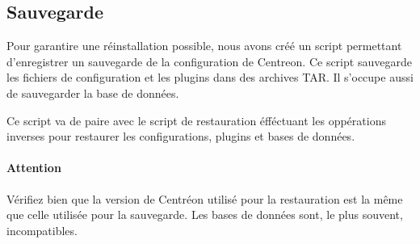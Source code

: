 	\subsection{Sauvegarde}

	Pour garantire une réinstallation possible, nous avons créé un script permettant d'enregistrer un sauvegarde de la configuration de Centreon.
	Ce script sauvegarde les fichiers de configuration et les plugins dans des archives TAR.
	Il s'occupe aussi de sauvegarder la base de données.

	Ce script va de paire avec le script de restauration éfféctuant les oppérations inverses pour restaurer les configurations, plugins et bases de données.

	\paragraph{Attention} Vérifiez bien que la version de Centréon utilisé pour la restauration est la même que celle utilisée pour la sauvegarde. Les bases de données sont, le plus souvent, incompatibles.
